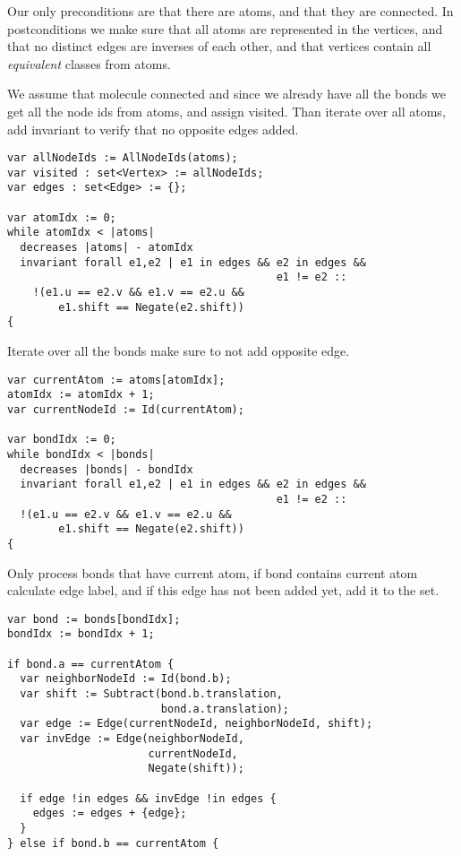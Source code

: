 Our only preconditions are that there are atoms, and that they are connected. In postconditions we make sure that all atoms are represented in the vertices, and that no distinct edges are inverses of each other, and that vertices contain all \textit{equivalent} classes from atoms.

We assume that molecule connected and since we already have all the bonds we get all the node ids from atoms, and assign visited. Than iterate over all atoms, add invariant to verify that no opposite edges added.

\begin{lstlisting}[caption={Outer loop},label={lst:invariant1}, literate={{forall}{forall}6 {exists}{exists}6}]
var allNodeIds := AllNodeIds(atoms);
var visited : set<Vertex> := allNodeIds;
var edges : set<Edge> := {};

var atomIdx := 0;
while atomIdx < |atoms|
  decreases |atoms| - atomIdx
  invariant forall e1,e2 | e1 in edges && e2 in edges &&
                                          e1 != e2 ::
    !(e1.u == e2.v && e1.v == e2.u &&
        e1.shift == Negate(e2.shift))
{
\end{lstlisting}

Iterate over all the bonds make sure to not add opposite edge.
\begin{lstlisting}[caption={Inner loop},label={lst:invariant2}, literate={{forall}{forall}6 {exists}{exists}6}]
var currentAtom := atoms[atomIdx];
atomIdx := atomIdx + 1;
var currentNodeId := Id(currentAtom);

var bondIdx := 0;
while bondIdx < |bonds|
  decreases |bonds| - bondIdx
  invariant forall e1,e2 | e1 in edges && e2 in edges &&
                                          e1 != e2 ::
  !(e1.u == e2.v && e1.v == e2.u &&
        e1.shift == Negate(e2.shift))
{
\end{lstlisting}

Only process bonds that have current atom, if bond contains current atom calculate edge label, and if this edge has not been added yet, add it to the set.
\begin{lstlisting}[caption={Inner loop, body},label={lst:loopbody}]
var bond := bonds[bondIdx];
bondIdx := bondIdx + 1;

if bond.a == currentAtom {
  var neighborNodeId := Id(bond.b);
  var shift := Subtract(bond.b.translation,
                        bond.a.translation);
  var edge := Edge(currentNodeId, neighborNodeId, shift);
  var invEdge := Edge(neighborNodeId,
                      currentNodeId,
                      Negate(shift));

  if edge !in edges && invEdge !in edges {
    edges := edges + {edge};
  }
} else if bond.b == currentAtom {
\end{lstlisting}

